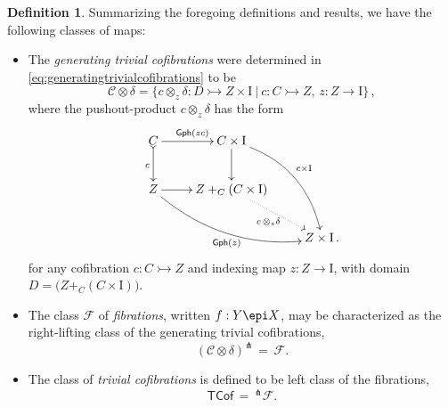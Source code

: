 \documentclass[12pt]{article}
\newcommand{\mono}{\ensuremath{\rightarrowtail}}
\newcommand{\ra}{\ensuremath{\rightarrow}}
\newcommand{\I}{\ensuremath{\mathrm{I}}}
\theoremstyle{remark}
\theoremstyle{definition}
\newtheorem{definition}[theorem]{Definition}
\begin{document}
\begin{definition}\label{def:FibWFSclasses}
Summarizing the foregoing definitions and results, we have the following classes of maps:

%
%

\begin{itemize}
\item  The \emph{generating trivial cofibrations} were determined in \eqref{eq:generatingtrivialcofibrations} to be
\begin{equation}\label{eq:genunbiasedTCof}
\mathcal{C}\otimes\delta = \{c \otimes_z \delta : D \mono Z\times\I\ |\  c : C\mono Z,\, z : Z \ra \I\}\,,
\end{equation}
where the pushout-product $c\otimes_z \delta$ has the form
\begin{equation}\label{diagram:unbiasedbasicpushoutproduct2}
\xymatrix{
C \ar@{>->}[d]_{c} \ar[r]^{\mathsf{Gph}(zc)} & C\times \I \ar[d] \ar@/^4ex/ [rdd]^{c\times\I}\\
Z \ar@/_4ex/ [rrd]_{\mathsf{Gph}(z)} \ar[r] &  Z +_C (C\times\I) \ar@{.>}[rd]_{c\, \otimes_z \delta} \\
&& Z\times\I\,.
}
\end{equation}
for any cofibration $c : C\mono Z$ and indexing map $z : Z \ra \I$, with domain $D = \big(Z +_C (C\times\I)\big)$.

\item The class $\mathcal{F}$ of \emph{fibrations}, written $f : Y\epi X$, may be characterized as the right-lifting class of the generating trivial cofibrations,
\[
(\mathcal{C}\otimes\delta)^\pitchfork\, =\,\mathcal{F}.
\]

\item The class of \emph{trivial cofibrations} is defined to be left class of the fibrations,
\[
\mathsf{TCof}\, =\, ^{\pitchfork}\mathcal{F}.
\]
\end{itemize}
\end{definition}
\end{document}
